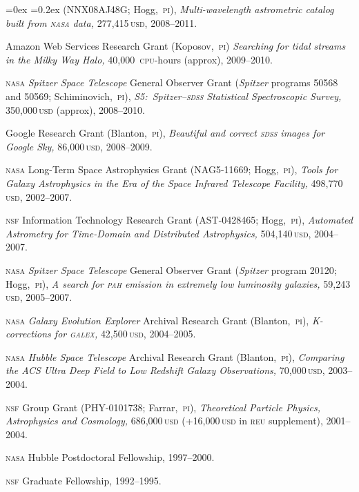 \documentclass[12pt,letterpaper]{article}
\newcommand{\satellite}[1]{\textsl{#1}}
\newcommand{\usd}[1]{{#1}\,\textsc{usd}}
\newcommand{\grantnumber}[2]{{\footnotesize{#1}}; #2,~\textsc{pi}}
\newcounter{refpubnum}
\newcommand{\hogglist}{%
    \rightmargin=0in
    \leftmargin=0.18in
    \topsep=0ex
    \partopsep=0pt
    \itemsep=0.2ex
    \parsep=0pt
    \itemindent=-1.0\leftmargin
    \listparindent=0.0\leftmargin
    \settowidth{\labelsep}{~}
    \usecounter{refpubnum}
  }
\begin{document}
\begin{list}{}{\hogglist}
(\grantnumber{NNX08AJ48G}{Hogg}),
\textit{Multi-wavelength astrometric catalog built from \textsc{nasa} data,}
\usd{277,415}, 2008--2011.
\item
Amazon Web Services Research Grant
(Koposov,~\textsc{pi})
\textit{Searching for tidal streams in the Milky Way Halo,}
40,000~\textsc{cpu}-hours (approx), 2009--2010.
\item
\textsc{nasa} \satellite{Spitzer Space Telescope} General Observer Grant
(\satellite{Spitzer} programs {\footnotesize{50568}} and {\footnotesize{50569}}; Schiminovich,~\textsc{pi}),
\textit{S5:\ Spitzer--\textsc{sdss} Statistical Spectroscopic Survey,}
\usd{350,000} (approx), 2008--2010.
\item
Google Research Grant
(Blanton,~\textsc{pi}), 
\textit{Beautiful and correct \textsc{sdss} images for Google Sky,}
\usd{86,000}, 2008--2009.
\item
\textsc{nasa} Long-Term Space Astrophysics Grant
(\grantnumber{NAG5-11669}{Hogg}),
\textit{Tools for Galaxy Astrophysics in the Era of the
\satellite{Space Infrared Telescope Facility,}}
\usd{498,770}, 2002--2007.
\item
\textsc{nsf} Information Technology Research Grant
(\grantnumber{AST-0428465}{Hogg}),
\textit{Automated Astrometry for Time-Domain and Distributed
Astrophysics,}
\usd{504,140}, 2004--2007.
\item
\textsc{nasa} \satellite{Spitzer Space Telescope} General Observer Grant
(\satellite{Spitzer} program {\footnotesize{20120}}; Hogg,~\textsc{pi}),
\textit{A search for \textsc{pah} emission in extremely low luminosity galaxies,}
\usd{59,243}, 2005--2007.
\item
\textsc{nasa} \satellite{Galaxy Evolution Explorer} Archival Research Grant
(Blanton,~\textsc{pi}),
\textit{K-corrections for \textsc{galex},}
\usd{42,500}, 2004--2005.
\item
\textsc{nasa} \satellite{Hubble Space Telescope} Archival Research Grant
(Blanton,~\textsc{pi}),
\textit{Comparing the ACS Ultra Deep Field to Low Redshift Galaxy Observations,}
\usd{70,000}, 2003--2004.
\item
\textsc{nsf} Group Grant
(\grantnumber{PHY-0101738}{Farrar}),
\textit{Theoretical Particle Physics, Astrophysics and Cosmology,}
\usd{686,000} (+\usd{16,000} in \textsc{reu} supplement), 2001--2004.
\item
\textsc{nasa} Hubble Postdoctoral Fellowship, 1997--2000.
\item
\textsc{nsf} Graduate Fellowship, 1992--1995.
\end{list}
\end{document}
